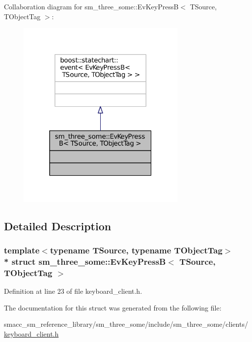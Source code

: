 Collaboration diagram for sm\+\_\+three\+\_\+some\+:\+:Ev\+Key\+PressB$<$ T\+Source, T\+Object\+Tag $>$\+:
\nopagebreak
\begin{figure}[H]
\begin{center}
\leavevmode
\includegraphics[width=235pt]{structsm__three__some_1_1EvKeyPressB__coll__graph}
\end{center}
\end{figure}


\subsection{Detailed Description}
\subsubsection*{template$<$typename T\+Source, typename T\+Object\+Tag$>$\\*
struct sm\+\_\+three\+\_\+some\+::\+Ev\+Key\+Press\+B$<$ T\+Source, T\+Object\+Tag $>$}



Definition at line 23 of file keyboard\+\_\+client.\+h.



The documentation for this struct was generated from the following file\+:\begin{DoxyCompactItemize}
\item 
smacc\+\_\+sm\+\_\+reference\+\_\+library/sm\+\_\+three\+\_\+some/include/sm\+\_\+three\+\_\+some/clients/\hyperlink{keyboard__client_8h}{keyboard\+\_\+client.\+h}\end{DoxyCompactItemize}
